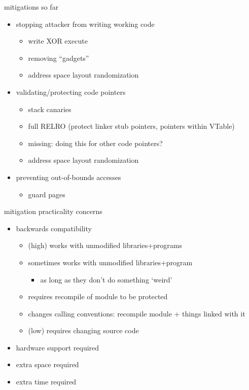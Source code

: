 \begin{frame}{mitigations so far}
    \begin{itemize}
    \item stopping attacker from writing working code
        \begin{itemize}
        \item write XOR execute
        \item removing ``gadgets''
        \item address space layout randomization
        \end{itemize}
    \item validating/protecting code pointers
        \begin{itemize}
        \item stack canaries
        \item full RELRO (protect linker stub pointers, pointers within VTable)
        \item missing: doing this for other code pointers?
        \item address space layout randomization
        \end{itemize}
    \item preventing out-of-bounds accesses
        \begin{itemize}
        \item guard pages
        \end{itemize}
    \end{itemize}
\end{frame} 

\begin{frame}{mitigation practicality concerns}
    \begin{itemize}
    \item backwards compatibility
        \begin{itemize}
        \item (high) works with unmodified libraries+programs
        \item sometimes works with unmodified libraries+program
            \begin{itemize}
            \item as long as they don't do something `weird'
            \end{itemize}
        \item requires recompile of module to be protected
        \item changes calling conventions: recompile module + things linked with it
        \item (low) requires changing source code
        \end{itemize}
    \item hardware support required
    \item extra space required
    \item extra time required
    \end{itemize}
\end{frame}


